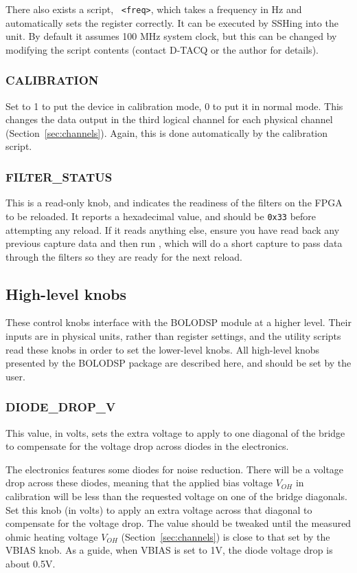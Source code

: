 \documentclass[12pt,a4paper]{article}
\begin{document}
There also exists a script, ~\texttt{<freq>}, which takes a frequency in Hz and automatically sets the register
correctly. It can be executed by SSHing into the unit. By default it assumes 100 MHz system clock, but this can be changed by modifying the script
contents (contact D-TACQ or the author for details).

\subsubsection{CALIBRATION}
Set to 1 to put the device in calibration mode, 0 to put it in normal mode. This changes the data output in the third logical channel for each physical
channel (Section~\ref{sec:channels}). Again, this is done automatically by the calibration script.

\subsubsection{FILTER{\_}STATUS}
This is a read-only knob, and indicates the readiness of the filters on the FPGA to be reloaded. It reports a hexadecimal value, and should be
\texttt{0x33} before attempting any reload. If it reads anything else, ensure you have read back any previous capture data and then run
\mbox{}, which will do a short capture to pass data through the filters so they are ready for the next reload.

\subsection{High-level knobs}
\label{sec:knobshl}
These control knobs interface with the BOLODSP module at a higher level. Their inputs are in physical units, rather than register settings, and the
utility scripts read these knobs in order to set the lower-level knobs. All high-level knobs presented by the BOLODSP package are described here, and
should be set by the user.

\subsubsection{DIODE{\_}DROP{\_}V}
This value, in volts, sets the extra voltage to apply to one diagonal of the bridge to compensate for the voltage drop across diodes in the electronics.

The electronics features some diodes for noise reduction. There will be a voltage drop across these diodes, meaning that the applied bias voltage $V_{OH}$
in calibration will be less than the requested voltage on one of the bridge diagonals. Set this knob (in volts) to apply an extra voltage across that
diagonal to compensate for the voltage drop. The value should be tweaked until the measured ohmic heating voltage $V_{OH}$ (Section~\ref{sec:channels}) is
close to that set by the VBIAS knob. As a guide, when VBIAS is set to 1V, the diode voltage drop is about 0.5V.
\end{document}
